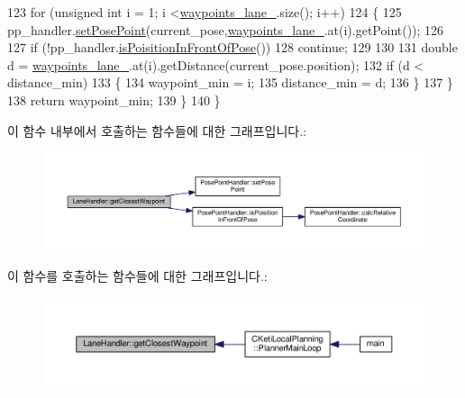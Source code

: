 \begin{DoxyCode}
123     \textcolor{keywordflow}{for} (\textcolor{keywordtype}{unsigned} \textcolor{keywordtype}{int} i = 1; i <\hyperlink{class_lane_handler_ac65a0139b3900a7c8dc3fe49d7a684f3}{waypoints\_lane\_}.size(); i++)
124     \{
125       pp\_handler.\hyperlink{class_pose_point_handler_a6d037671a1c93d9d51a7b0e40eacd3fa}{setPosePoint}(current\_pose,\hyperlink{class_lane_handler_ac65a0139b3900a7c8dc3fe49d7a684f3}{waypoints\_lane\_}.at(i).getPoint());
126 
127       \textcolor{keywordflow}{if} (!pp\_handler.\hyperlink{class_pose_point_handler_a030d4318ea42d398798b675624ebd07b}{isPoisitionInFrontOfPose}())
128         \textcolor{keywordflow}{continue};
129 
130 
131       \textcolor{keywordtype}{double} d = \hyperlink{class_lane_handler_ac65a0139b3900a7c8dc3fe49d7a684f3}{waypoints\_lane\_}.at(i).getDistance(current\_pose.position);
132       \textcolor{keywordflow}{if} (d < distance\_min)
133       \{
134         waypoint\_min = i;
135         distance\_min = d;
136       \}
137     \}
138     \textcolor{keywordflow}{return} waypoint\_min;
139   \}
140 \}
\end{DoxyCode}


이 함수 내부에서 호출하는 함수들에 대한 그래프입니다.\+:\nopagebreak
\begin{figure}[H]
\begin{center}
\leavevmode
\includegraphics[width=350pt]{class_lane_handler_a71033c4e67c07e09c2c3c18fabfb7463_cgraph}
\end{center}
\end{figure}




이 함수를 호출하는 함수들에 대한 그래프입니다.\+:\nopagebreak
\begin{figure}[H]
\begin{center}
\leavevmode
\includegraphics[width=350pt]{class_lane_handler_a71033c4e67c07e09c2c3c18fabfb7463_icgraph}
\end{center}
\end{figure}


